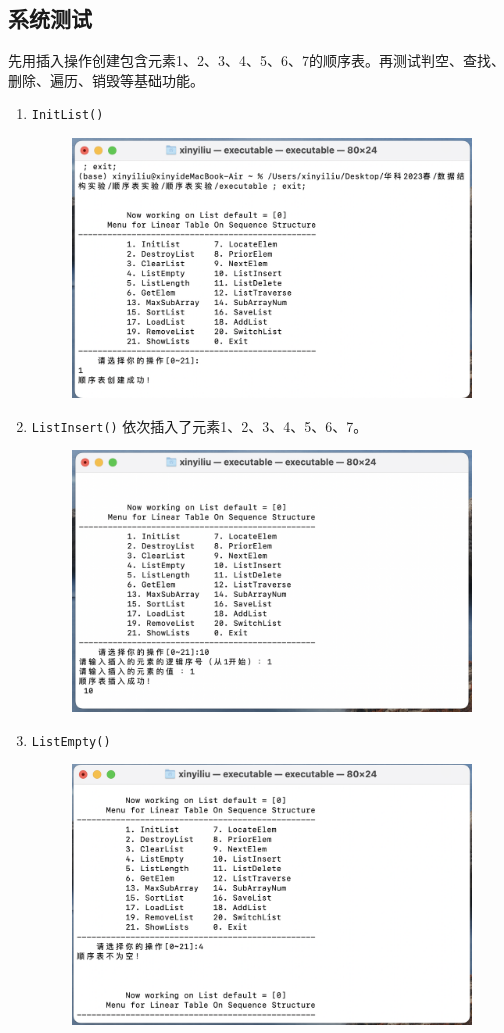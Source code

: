 \documentclass[supercite]{Experimental_Report}
\theoremstyle{definition}
\begin{document}
\subsection{系统测试}
先用插入操作创建包含元素1、2、3、4、5、6、7的顺序表。再测试判空、查找、删除、遍历、销毁等基础功能。
\begin{enumerate}
\item \verb|InitList()|
	\begin{figure}[!htb]
		\includegraphics[width=0.8\linewidth]{images/截屏2023-06-01 18.21.29.png}
	\end{figure}
\FloatBarrier

\item \verb|ListInsert()|
	依次插入了元素1、2、3、4、5、6、7。
	\begin{figure}[!htb]
		\includegraphics[width=0.8\linewidth]{images/截屏2023-06-01 18.21.51.png}
	\end{figure}
	\FloatBarrier
\newpage

\item \verb|ListEmpty()|
	\begin{figure}[!htb]
		\includegraphics[width=0.8\linewidth]{images/截屏2023-06-01 18.23.33.png}
	\end{figure}
	\FloatBarrier


\end{enumerate}
\end{document}
